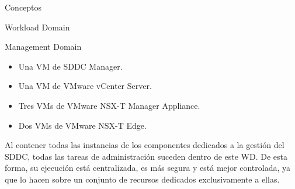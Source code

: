\begin{section}{Conceptos}
\begin{subsection}{Workload Domain}
\begin{subsubsection}{Management Domain}
\begin{itemize}
  \item Una VM de SDDC Manager.
  \item Una VM de VMware vCenter Server.
  \item Tres VMs de VMware NSX-T Manager Appliance.
  \item Dos VMs de VMware NSX-T Edge.
\end{itemize}
Al contener todas las instancias de los componentes dedicados a la gestión del SDDC, todas las tareas de administración suceden dentro de este WD. De esta forma, su ejecución está centralizada, es más segura y está mejor controlada, ya que lo hacen sobre un conjunto de recursos dedicados exclusivamente a ellas.




\end{subsubsection}
\end{subsection}
\end{section}
